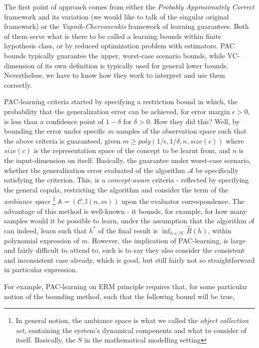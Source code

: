 The first point of approach comes from either the \textit{Probably Approximately Correct} framework and its variation (we would like to talk of the singular original framework) or the \textit{Vapnik-Chervonenkis} framework of learning guarantees. Both of them serve what is there to be called a learning bounds within finite hypothesis class, or by reduced optimization problem with estimators. PAC bounds typically guarantee the upper, worst-case scenario bounds, while VC-dimension of its own definition is typically used for general lower bounds. Nevertheless, we have to know how they work to interpret and use them correctly.

PAC-learning criteria started by specifying a restriction bound in which, the probability that the generalization error can be achieved, for error margin $\epsilon > 0$, is less than a confidence point of $1-\delta$ for $\delta > 0$. How they did this? Well, by bounding the error under specific $m$ samples of the observation space such that the above criteria is guaranteed, given $m\geq poly(1/\epsilon, 1/\delta, n,size(c))$ where $size(c)$ is the representation space of the concept to be learnt from, and $n$ is the input-dimension on itself. Basically, the guarantee under worst-case scenario, whether the generalization error evaluated of the algorithm $\mathcal{A}$ be specifically satisfying the criterion. This, is a \textit{concept-aware} criteria - reflected by specifying the general copula, restricting the algorithm and consider the term of the \textit{ambiance space} \footnote{In general notion, the ambiance space is what we called the \textit{object collection set}, containing the system's dynamical components and what to consider of itself. Basically, the $S$ in the mathematical modelling setting} $\mathbb{A}=(\mathcal{C},\mathbb{I}(n,m))$ upon the evaluator correspondence. The advantage of this method is well-known - it bounds, for example, for how many samples would it be possible to learn, under the assumption that the algorithm $\mathcal{A}$ can indeed, learn such that $h^{*}$ of the final result is $\inf_{h\in\mathcal{H}}\hat{R}(h)$, within polynomial expression of $m$. However, the implication of PAC-learning, is large and fairly difficult to attend to, such is to say they also consider the consistent and inconsistent case already, which is good, but still fairly not so straightforward in particular expression. 

For example, PAC-learning on ERM principle requires that, for some particular notion of the bounding method, such that the following bound will be true, 



